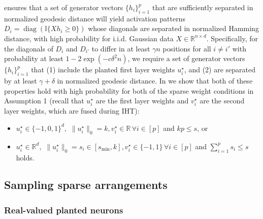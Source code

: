 \documentclass{article} %
\newcommand{\n}{\ensuremath{n}}
\newcommand{\p}{\ensuremath{p}}
\newcommand{\datadim}{\ensuremath{d}}
\newcommand{\X}{\ensuremath{X}}
\newcommand{\h}{\ensuremath{h}}
\DeclareMathOperator{\diag}{diag}
\newcommand{\1}{\ensuremath{{\sf (i)}}}
\newcommand{\2}{\ensuremath{{\sf (ii)}}}
\newcommand{\3}{\ensuremath{{\sf (iii)}}}
\newcommand{\4}{\ensuremath{{\sf (iv)}}}
\newcommand{\5}{\ensuremath{{\sf (v)}}}
\newcommand{\6}{\ensuremath{{\sf (vi)}}}
\newcommand{\R}{\mathbb{R}}
\begin{document}
 ensures that a set of generator vectors $\{\h_i\}_{i=1}^\p$ that are sufficiently separated in normalized geodesic distance will yield activation patterns $D_i = \diag{(\mathbb{I}\{\X\h_i \geq 0\})}$ whose diagonals are separated in normalized Hamming distance, with high probability for i.i.d. Gaussian data $\X \in \R^{\n\times\datadim}$.
Specifically, for the diagonals of $D_i$ and $D_{i'}$ to differ in at least $\gamma\n$ positions for all $i \neq i'$ with probability at least $1 - 2\exp(-c\delta^2\n)$, we require a set of generator vectors $\{\h_i\}_{i=1}^\p$ that (1) include the planted first layer weights $u^\star_i$, and (2) are separated by at least $\gamma + \delta$ in normalized geodesic distance.
In  we show that both of these properties hold with high probability for both of the sparse weight conditions in Assumption 1 (recall that $u_i^\star$ are the first layer weights and $v_i^\star$ are the second layer weights, which are fused during IHT):
\begin{itemize}
    \item[(a)] $u_i^\star\in \{-1,0,1\}^\datadim,$ $\|u_i^\star\|_0= k, v_i^\star\in \R\,\forall i\in[\p]$ and $k\p \le s$, or
    \item[(b)] $u_i^\star\in \R^\datadim,$ $\|u^\star_i\|_0  =s_i \in [s_\text{min}, k], v_i^\star\in \{-1,1\}\,\forall i\in[\p]$ and $\sum_{i=1}^\p s_i \le s$ holds.
\end{itemize}






\subsection{Sampling sparse arrangements}
\label{sec:sampling_generators}
\subsubsection{Real-valued planted neurons}
\end{document}
